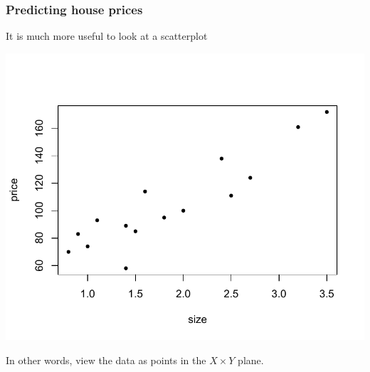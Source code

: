\documentclass{beamer}
\newcommand{\bl}{\color{lightblue}}
\newcommand{\rd}{\color{burntorange}}
\newcommand{\bk}{\color{black}}
\newcommand{\skoo}{\vspace{.2in}}
\begin{document}

\begin{frame}
\frametitle{Predicting house prices}

\vspace{2mm}
It is much more useful to look at a scatterplot \vspace{-10mm}
\begin{center}\includegraphics[scale=0.65]{figures/houseplot}\end{center}

\vspace{-5mm}
In other words, view the data as points in the $X
\times Y$ plane.
\end{frame}



%
%
%
%

\end{document}
